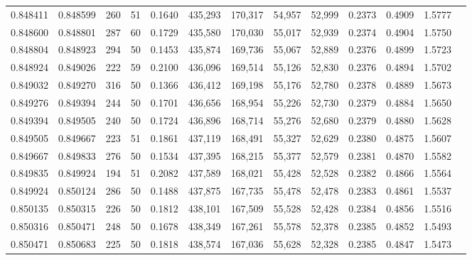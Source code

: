 \begin{tabular}{rrrrrrrrrrrrr}
0.848411 & 0.848599 &   260 &  51 &                                     0.1640 & 435,293 & 170,317 &  54,957 &  52,999 & 0.2373 & 0.4909 & 1.5777 \\
0.848600 & 0.848801 &   287 &  60 &                                     0.1729 & 435,580 & 170,030 &  55,017 &  52,939 & 0.2374 & 0.4904 & 1.5750 \\
0.848804 & 0.848923 &   294 &  50 &                                     0.1453 & 435,874 & 169,736 &  55,067 &  52,889 & 0.2376 & 0.4899 & 1.5723 \\
0.848924 & 0.849026 &   222 &  59 &                                     0.2100 & 436,096 & 169,514 &  55,126 &  52,830 & 0.2376 & 0.4894 & 1.5702 \\
0.849032 & 0.849270 &   316 &  50 &                                     0.1366 & 436,412 & 169,198 &  55,176 &  52,780 & 0.2378 & 0.4889 & 1.5673 \\
0.849276 & 0.849394 &   244 &  50 &                                     0.1701 & 436,656 & 168,954 &  55,226 &  52,730 & 0.2379 & 0.4884 & 1.5650 \\
0.849394 & 0.849505 &   240 &  50 &                                     0.1724 & 436,896 & 168,714 &  55,276 &  52,680 & 0.2379 & 0.4880 & 1.5628 \\
0.849505 & 0.849667 &   223 &  51 &                                     0.1861 & 437,119 & 168,491 &  55,327 &  52,629 & 0.2380 & 0.4875 & 1.5607 \\
0.849667 & 0.849833 &   276 &  50 &                                     0.1534 & 437,395 & 168,215 &  55,377 &  52,579 & 0.2381 & 0.4870 & 1.5582 \\
0.849835 & 0.849924 &   194 &  51 &                                     0.2082 & 437,589 & 168,021 &  55,428 &  52,528 & 0.2382 & 0.4866 & 1.5564 \\
0.849924 & 0.850124 &   286 &  50 &                                     0.1488 & 437,875 & 167,735 &  55,478 &  52,478 & 0.2383 & 0.4861 & 1.5537 \\
0.850135 & 0.850315 &   226 &  50 &                                     0.1812 & 438,101 & 167,509 &  55,528 &  52,428 & 0.2384 & 0.4856 & 1.5516 \\
0.850316 & 0.850471 &   248 &  50 &                                     0.1678 & 438,349 & 167,261 &  55,578 &  52,378 & 0.2385 & 0.4852 & 1.5493 \\
0.850471 & 0.850683 &   225 &  50 &                                     0.1818 & 438,574 & 167,036 &  55,628 &  52,328 & 0.2385 & 0.4847 & 1.5473 \\

\end{tabular}
